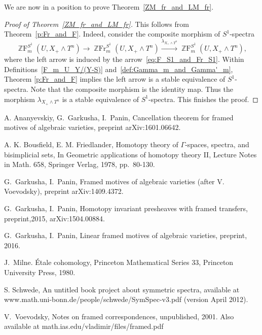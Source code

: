 \documentclass[a4paper,11pt,reqno]{amsart}
\begin{document}
We are now in a position to prove Theorem~\ref{ZM_fr_and_LM_fr}.

\begin{proof}[Proof of Theorem~\ref{ZM_fr_and_LM_fr}]
This follows from Theorem~\ref{p:Fr_and_F}.
Indeed, consider the composite morphism of $S^1$-spectra
   $${\operatorname{\mathbb{Z}F}}^{S^1}_m(U,X_+\wedge T^n)\to {\operatorname{\mathbb{Z}Fr}}^{S^1}_m(U,X_+\wedge T^n)\xrightarrow{\lambda_{X_+\wedge T^n}} {\operatorname{\mathbb{Z}F}}^{S^1}_m(U,X_+\wedge T^n),$$
where the left arrow is induced by the arrow~\eqref{eq:F_S1_and_Fr_S1}.
Within Definitions~\ref{F_m_U_Y/(Y-S)} and~\ref{def:Gamma_m_and_Gamma'_m}, Theorem \ref{p:Fr_and_F} implies the left arrow is a
stable equivalence of $S^1$-spectra. Note that the composite morphism is the identity map.
Thus the morphism $\lambda_{X_+\wedge T^n}$ is a stable equivalence of $S^1$-spectra.
This finishes the proof.
\end{proof}

\begin{thebibliography}{XXXX}

A. Ananyevskiy, G.~Garkusha, I.~Panin, Cancellation theorem for
framed motives of algebraic varieties, preprint arXiv:1601.06642.

A. K. Bousfield, E. M. Friedlander, Homotopy theory of $\Gamma$-spaces, spectra, and bisimplicial sets, 
In Geometric applications of homotopy theory II, Lecture Notes in Math. 658, Springer Verlag, 1978, pp.~80-130.

G.~Garkusha, I.~Panin, Framed motives of algebraic varieties (after
V. Voevodsky), preprint arXiv:1409.4372.

G.~Garkusha, I.~Panin, Homotopy invariant presheaves with framed transfers,
preprint,2015, arXiv:1504.00884.

G.~Garkusha, I.~Panin, Linear framed motives of algebraic varieties,
preprint, 2016.

J.~Milne. \'Etale cohomology, Princeton Mathematical Series 33,
Princeton University Press, 1980.

 S. Schwede, {An untitled book project about symmetric spectra},
         available at www.math.uni-bonn.de/people/schwede/SymSpec-v3.pdf (version April 2012).

V.~Voevodsky, Notes on framed correspondences, unpublished, 2001.
Also available at math.ias.edu/vladimir/files/framed.pdf

\end{thebibliography}
\end{document}

